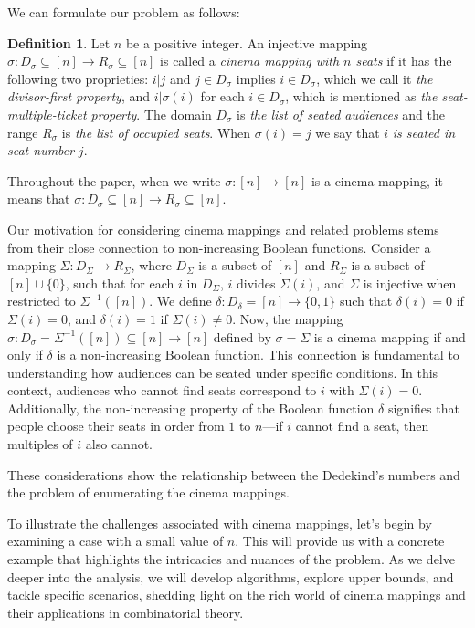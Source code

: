 \documentclass{amsart}
\theoremstyle{definition}
\newtheorem{definition}[theorem]{Definition}
\begin{document}
We can formulate our problem as follows:

\begin{definition}
Let $n$ be a positive integer. An injective mapping $\sigma:D_\sigma\subseteq [n]\to R_\sigma\subseteq[n]$ is called a \textit{cinema mapping with $n$ seats} if it has the following two proprieties: $i|j$ and $j\in D_\sigma$ implies $i\in D_\sigma$, which we call it \textit{the divisor-first property}, and $i|\sigma(i)$ for each $i\in D_\sigma$, which is mentioned as \textit{the seat-multiple-ticket property}. The domain $D_\sigma$ is \textit{the list of seated audiences} and the range $R_\sigma$ is \textit{the list of occupied seats}. When $\sigma(i)=j$ we say that $i$ \textit{is seated in seat number} $j$. 
\end{definition}

Throughout the paper, when we write $\sigma:[n]\to[n]$ is a cinema mapping, it means that $\sigma:D_\sigma\subseteq [n]\to R_\sigma\subseteq[n].$

Our motivation for considering cinema mappings and related problems stems from their close connection to non-increasing Boolean functions. Consider a mapping $\Sigma:D_\Sigma\to R_\Sigma$, where $D_\Sigma$ is a subset of $[n]$ and $R_\Sigma$ is a subset of $[n]\cup\{0\}$, such that for each $i$ in $D_\Sigma$, $i$ divides $\Sigma(i)$, and $\Sigma$ is injective when restricted to $\Sigma^{-1}([n])$. We define $\delta:D_\delta=[n]\to\{0,1\}$ such that $\delta(i)=0$ if $\Sigma(i)=0$, and $\delta(i)=1$ if $\Sigma(i)\neq0$. Now, the mapping $\sigma:D_\sigma=\Sigma^{-1}([n])\subseteq[n]\to[n]$ defined by $\sigma=\Sigma$ is a cinema mapping if and only if $\delta$ is a non-increasing Boolean function. This connection is fundamental to understanding how audiences can be seated under specific conditions. In this context, audiences who cannot find seats correspond to $i$ with $\Sigma(i)=0$. Additionally, the non-increasing property of the Boolean function $\delta$ signifies that people choose their seats in order from $1$ to $n$—if $i$ cannot find a seat, then multiples of $i$ also cannot.

These considerations show the relationship between the Dedekind's numbers and the problem of enumerating the cinema mappings. 

To illustrate the challenges associated with cinema mappings, let's begin by examining a case with a small value of $n$. This will provide us with a concrete example that highlights the intricacies and nuances of the problem. As we delve deeper into the analysis, we will develop algorithms, explore upper bounds, and tackle specific scenarios, shedding light on the rich world of cinema mappings and their applications in combinatorial theory.
\end{document}
